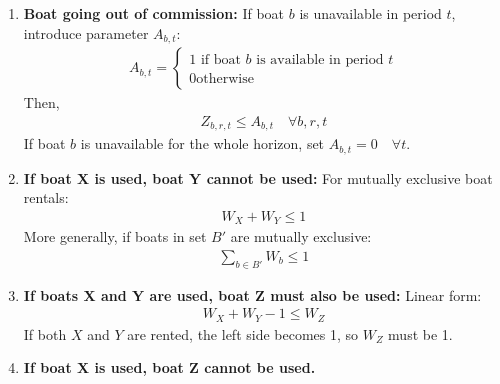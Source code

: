 \documentclass[10pt]{article}
\begin{document}
\begin{enumerate}
\begin{gather*}
\begin{cases}
            0\text{otherwise}
        \end{cases}
    \end{gather*}
    Then force production, inventory, and shipments through that site to zero: 
    \begin{gather*}
        X_{i, t} \le M A_{i, t}\quad\forall i, t\\
        I_{i, t}\le \text{icap}_i A_{i, t}\quad\forall i, t\\
        N_{i, k, t} \le M A_{i, t}\quad\forall i, k, t\\
        O_{i, j, t}\le M A_{i, t}\quad\forall i, j, t\\
        O_{j, i, t}\le M A_{i, t}\quad\forall i, j, t
    \end{gather*}
    This prevents production, storage, outgoing transport, and incoming transport at a closed site 
    \item \textbf{Boat going out of commission:} If boat $b $ is unavailable in period $t $, introduce parameter $A_{b, t} $: 
    \begin{gather*}
        A_{b, t} = \begin{cases}
            1\text{ if boat $b $ is available in period $t $}\\
            0\text{otherwise}
        \end{cases}
    \end{gather*}
    Then, 
    \begin{gather*}
        Z_{b, r, t} \le A_{b, t}\quad\forall b, r, t
    \end{gather*}
    If boat $b $ is unavailable for the whole horizon, set $A_{b, t} = 0\quad\forall t $.
    \item \textbf{If boat X is used, boat Y cannot be used:} For mutually exclusive boat rentals: 
    \begin{gather*}
        W_X + W_Y \le 1
    \end{gather*}
    More generally, if boats in set $B' $ are mutually exclusive: 
    \begin{gather*}
        \sum_{b\in B'}W_b \le 1
    \end{gather*}
    \item \textbf{If boats X and Y are used, boat Z must also be used:} Linear form: 
    \begin{gather*}
        W_X + W_Y - 1\le W_Z
    \end{gather*}
    If both $X $ and $Y $ are rented, the left side becomes 1, so $W_Z $ must be 1.
    \item \textbf{If boat X is used, boat Z cannot be used.}

\end{enumerate}
\end{document}
